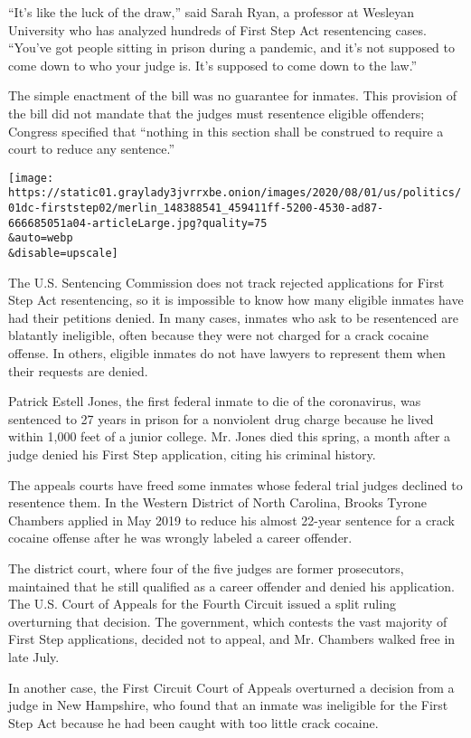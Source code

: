 ``It's like the luck of the draw,'' said Sarah Ryan, a professor at
Wesleyan University who has analyzed hundreds of First Step Act
resentencing cases. ``You've got people sitting in prison during a
pandemic, and it's not supposed to come down to who your judge is. It's
supposed to come down to the law.''

The simple enactment of the bill was no guarantee for inmates. This
provision of the bill did not mandate that the judges must resentence
eligible offenders; Congress specified that ``nothing in this section
shall be construed to require a court to reduce any sentence.''

\texttt{[image: https://static01.graylady3jvrrxbe.onion/images/2020/08/01/us/politics/01dc-firststep02/merlin\_148388541\_459411ff-5200-4530-ad87-666685051a04-articleLarge.jpg?quality=75\\\&auto=webp\\\&disable=upscale]}

The U.S. Sentencing Commission does not track rejected applications for
First Step Act resentencing, so it is impossible to know how many
eligible inmates have had their petitions denied. In many cases, inmates
who ask to be resentenced are blatantly ineligible, often because they
were not charged for a crack cocaine offense. In others, eligible
inmates do not have lawyers to represent them when their requests are
denied.

Patrick Estell Jones, the first federal inmate to die of the
coronavirus, was sentenced to 27 years in prison for a nonviolent drug
charge because he lived within 1,000 feet of a junior college. Mr. Jones
died this spring, a month after a judge denied his First Step
application, citing his criminal history.

The appeals courts have freed some inmates whose federal trial judges
declined to resentence them. In the Western District of North Carolina,
Brooks Tyrone Chambers applied in May 2019 to reduce his almost 22-year
sentence for a crack cocaine offense after he was wrongly labeled a
career offender.

The district court, where four of the five judges are former
prosecutors, maintained that he still qualified as a career offender and
denied his application. The U.S. Court of Appeals for the Fourth Circuit
issued a split ruling overturning that decision. The government, which
contests the vast majority of First Step applications, decided not to
appeal, and Mr. Chambers walked free in late July.

In another case, the First Circuit Court of Appeals overturned a
decision from a judge in New Hampshire, who found that an inmate was
ineligible for the First Step Act because he had been caught with too
little crack cocaine.

